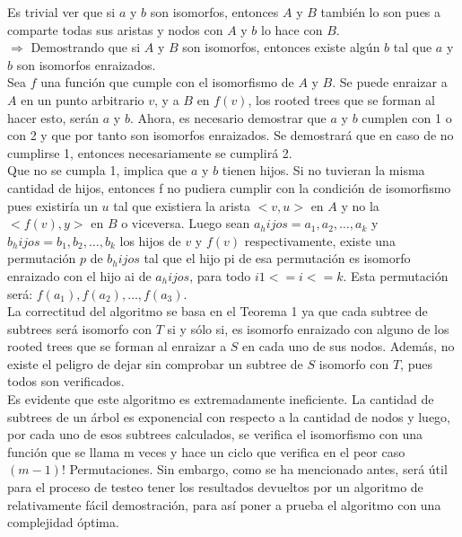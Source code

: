 \documentclass[a4paper,12pt,twocolumn]{article}
\begin{document}
	Es trivial ver que si $a$ y $b$ son isomorfos, entonces $A$ y $B$ también lo son pues a comparte todas sus aristas y nodos con $A$ y $b$ lo hace con $B$.\\
	
	$\Rightarrow$ Demostrando que si $A$ y $B$ son isomorfos, entonces existe algún $b$ tal que $a$ y $b$ son isomorfos enraizados.\\
	Sea $f$ una función que cumple con el isomorfismo de $A$ y $B$. Se puede enraizar a $A$ en un punto arbitrario $v$, y a $B$ en $f(v)$, los rooted trees que se forman al hacer esto, serán $a$ y $b$. Ahora, es necesario demostrar que $a$ y $b$ cumplen con 1 o con 2 y que por tanto son isomorfos enraizados. Se demostrará que en caso de no cumplirse 1, entonces necesariamente se cumplirá 2.\\
	
	Que no se cumpla 1, implica que $a$ y $b$ tienen hijos. Si no tuvieran la misma cantidad de hijos, entonces f no pudiera cumplir con la condición de isomorfismo pues existiría un $u$ tal que existiera la arista $<v, u>$ en $A$ y no la $<f(v), y>$ en $B$ o viceversa. Luego sean $a_hijos = a_1, a_2, … , a_k$ y $b_hijos = b_1, b_2, … , b_k$ los hijos de $v$ y $f(v)$ respectivamente, existe una permutación $p$ de $b_hijos$ tal que el hijo pi de esa permutación es isomorfo enraizado con el hijo ai de $a_hijos$, para todo $i 1 <= i <= k$. Esta permutación será: $f(a_1), f(a_2), … , f(a_3)$.\\
	
	
	La correctitud del algoritmo se basa en el Teorema 1 ya que cada subtree de subtrees será isomorfo con $T$ si y sólo si, es isomorfo enraizado con alguno de los rooted trees que se forman al enraizar a $S$ en cada uno de sus nodos. Además, no existe el peligro de dejar sin comprobar un subtree de $S$ isomorfo con $T$, pues todos son verificados.\\
	
	Es evidente que este algoritmo es extremadamente ineficiente. La cantidad de subtrees de un árbol es exponencial con respecto a la cantidad de nodos y luego, por cada uno de esos subtrees calculados, se verifica el isomorfismo con una función que se llama m veces y hace un ciclo que verifica en el peor caso $(m-1)!$ Permutaciones. Sin embargo, como se ha mencionado antes, será útil para el proceso de testeo tener los resultados devueltos por un algoritmo de relativamente fácil demostración, para así poner a prueba el algoritmo con una complejidad óptima.\\
		
\end{document}
